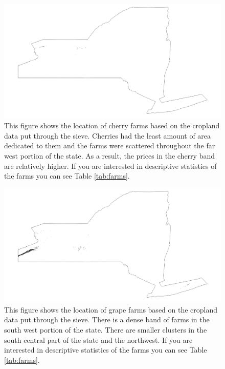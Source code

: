 \documentclass{report}
\begin{document}
\begin{figure}
\centering
\begin{framed}
\includegraphics[scale=.50]{farms_66}
\caption{This figure shows the location of cherry farms based on the cropland data put through the sieve. Cherries had the least amount of area dedicated to them and the farms were scattered throughout the far west portion of the state. As a result, the prices in the cherry band are relatively higher. If you are interested in descriptive statistics of the farms you can see Table \ref{tab:farms}.}
\label{fig:farms_66}
\end{framed}
\end{figure}

\begin{figure}
\centering
\begin{framed}
\includegraphics[scale=.50]{farms_69}
\caption{This figure shows the location of grape farms based on the cropland data put through the sieve. There is a dense band of farms in the south west portion of the state. There are smaller clusters in the south central part of the state and the northwest. If you are interested in descriptive statistics of the farms you can see Table \ref{tab:farms}.}
\label{fig:farms_69}
\end{framed}
\end{figure}
\end{document}
